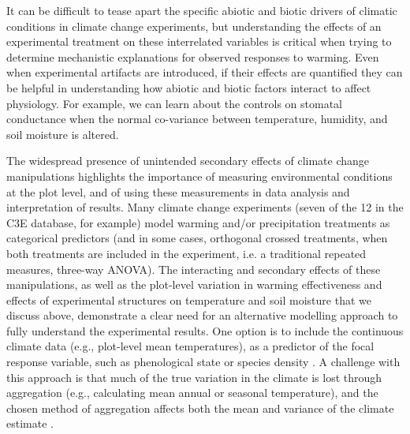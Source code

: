 \documentclass{article}
\begin{document}
\par It can be difficult to tease apart the specific abiotic and biotic drivers of climatic conditions in climate change experiments, but understanding the effects of an experimental treatment on these interrelated variables is critical when trying to determine mechanistic explanations for observed responses to warming. Even when experimental artifacts are introduced, if their effects are quantified they can be helpful in understanding how abiotic and biotic factors interact to affect physiology. For example, we can learn about the controls on stomatal conductance when the normal co-variance between temperature, humidity, and soil moisture is altered. 
\par The widespread presence of unintended secondary effects of climate change manipulations highlights the importance of measuring environmental conditions at the plot level, and of using these measurements in data analysis and interpretation of results. Many climate change experiments (seven of the 12 in the C3E database, for example) model warming and/or precipitation treatments as categorical predictors (and in some cases, orthogonal crossed treatments, when both treatments are included in the experiment, i.e. a traditional repeated measures, three-way ANOVA). The interacting and secondary effects of these manipulations, as well as the plot-level variation in warming effectiveness and effects of experimental structures on temperature and soil moisture that we discuss above, demonstrate a clear need for an alternative modelling approach to fully understand the experimental results. One option is to include the continuous climate data (e.g., plot-level mean temperatures), as a predictor of the focal response variable, such as phenological state or species density \citep [e.g.,][]{marchin2015, pelini2014}. A challenge with this approach is that much of the true variation in the climate is lost through aggregation (e.g., calculating mean annual or seasonal temperature), and the chosen method of aggregation affects both the mean and variance of the climate estimate \citep [e.g.,][]{clark2014b}. 
\end{document}
